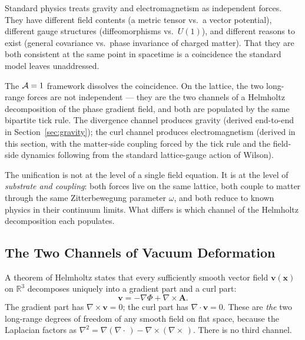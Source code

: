 
\label{sec:vacuum_twist}

Standard physics treats gravity and electromagnetism as independent
forces. They have different field contents (a metric tensor vs.\ a
vector potential), different gauge structures (diffeomorphisms vs.\
$U(1)$), and different reasons to exist (general covariance vs.\
phase invariance of charged matter). That they are both consistent at
the same point in spacetime is a coincidence the standard model leaves
unaddressed.

The $\mathcal{A}=1$ framework dissolves the coincidence.
On the lattice, the two long-range forces are not independent --- they
are the two channels of a Helmholtz decomposition of the phase
gradient field, and both are populated by the same bipartite tick
rule. The divergence channel produces gravity
(derived end-to-end in Section~\ref{sec:gravity}); the curl channel
produces electromagnetism (derived in this section, with the
matter-side coupling forced by the tick rule and the field-side
dynamics following from the standard lattice-gauge action of Wilson).

The unification is not at the level of a single field equation. It is
at the level of \emph{substrate and coupling}: both forces live on the
same lattice, both couple to matter through the same Zitterbewegung
parameter $\omega$, and both reduce to known physics in their
continuum limits. What differs is which channel of the Helmholtz
decomposition each populates.

\subsection{The Two Channels of Vacuum Deformation}
\label{subsec:two_channels}

A theorem of Helmholtz states that every sufficiently smooth vector
field $\mathbf{v}(\mathbf{x})$ on $\mathbb{R}^3$ decomposes uniquely
into a gradient part and a curl part:
\begin{equation}
    \mathbf{v} = -\nabla\Phi + \nabla\times\mathbf{A}.
    \label{eq:helmholtz}
\end{equation}
The gradient part has $\nabla\times\mathbf{v} = 0$; the curl part has
$\nabla\cdot\mathbf{v} = 0$. These are \emph{the} two long-range
degrees of freedom of any smooth field on flat space, because the
Laplacian factors as
$\nabla^2 = \nabla(\nabla\cdot\,) - \nabla\times(\nabla\times\,)$.
There is no third channel.

